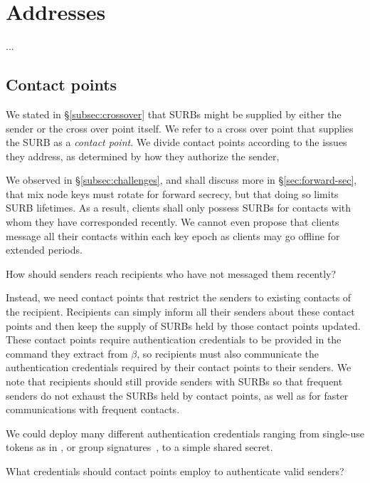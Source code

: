 
\section{Addresses}

...


\subsection{Contact points}\label{subsec:contact_points}

We stated in \S\ref{subsec:crossover} that SURBs might be supplied
by either the sender or the cross over point itself.  We refer to 
a cross over point that supplies the SURB as a {\em contact point}.
We divide contact points according to the issues they address,
as determined by how they authorize the sender,

We observed in \S\ref{subsec:challenges}, and shall discuss more in
\S\ref{sec:forward-sec}, that mix node keys must rotate for forward
secrecy, but that doing so limits SURB lifetimes.  
As a result, clients shall only possess SURBs for contacts with whom
they have corresponded recently.  We cannot even propose that clients
message all their contacts within each key epoch as clients may go
offline for extended periods.

\begin{issue}
How should senders reach recipients who have not messaged them recently?
\end{issue}

Instead, we need contact points that restrict the senders to existing
contacts of the recipient.  Recipients can simply inform all their
senders about these contact points and then keep the supply of SURBs
held by those contact points updated.  These contact points require
authentication credentials to be provided in the command they extract
from $\beta$, so recipients must also communicate the authentication
credentials required by their contact points to their senders.
We note that recipients should still provide senders with SURBs so
that frequent senders do not exhaust the SURBs held by contact points,
as well as for faster communications with frequent contacts.

We could deploy many different authentication credentials ranging 
from single-use tokens as in \cite{agl-pond-hmac}, or
 group signatures~\cite{BBS,VLR}, to a simple shared secret.

\begin{issue}
What credentials should contact points employ to authenticate valid senders?
\end{issue}

